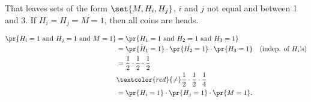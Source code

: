 \documentclass[handout]{mcs}
\begin{document}
\begin{problem}
\begin{solution}
  That leaves sets of the form $\set{M, H_i, H_j}$, $i$ and $j$ not equal
  and between 1 and 3.  If $H_i = H_j = M = 1$, then all coins are heads.

\begin{align*}
\pr{H_i=1 \text{ and } H_j = 1 \text{ and } M=1} & = \pr{H_1=1 \text{ and } H_2 = 1 \text{ and } H_3 =1}\\
    & = \pr{H_1=1}\cdot \pr{H_2 = 1} \cdot \pr{H_3 = 1}  & \text{(indep. of $H_i$'s)}\\
    & = \frac{1}{2} \cdot  \frac{1}{2} \cdot \frac{1}{2}\\
    & \textcolor{red}{\neq} \frac{1}{2} \cdot  \frac{1}{2} \cdot \frac{1}{4}\\
    & = \pr{H_i=1}\cdot \pr{H_j=1} \cdot \pr{M=1}.
\end{align*}
\end{solution}
\fi

\eparts
\end{problem}
\end{document}
